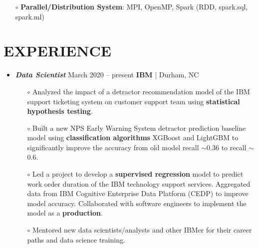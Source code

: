 \documentclass[10pt]{res}
\newcommand{\blockline}{\noindent\hspace{-0.03\textwidth}
{\rule{1.03\textwidth}{0.8pt}}}
\begin{document}
\begin{resume}
\begin{itemize}[leftmargin=0.0cm]
\item[$\circ$]{\textbf{Parallel/Distribution System}: MPI, OpenMP,  Spark (RDD, spark.sql, spark.ml)}
\end{itemize}

 \vspace{-0.25cm}

\section{\large EXPERIENCE}
\vspace{-0.2cm}
\noindent{\blockline}

\begin{itemize} [leftmargin=0.0cm]

\item {\sl \textbf{Data Scientist}}  \hfill March 2020 --  present \newline
 \textbf{IBM} | Durham, NC
 
 \begin{itemize}[leftmargin=0.35cm]
 \item[$\circ$] Analyzed the impact of a detractor recommendation model of the IBM support ticketing system on customer support team using \textbf{statistical hypothesis testing}.
 \item[$\circ$] Built a new NPS Early Warning System detractor prediction baseline model using \textbf{classification algorithms} XGBoost and LightGBM to significantly improve the accuracy from old model recall $\sim$0.36 to recall $\sim$0.6. 
 \item[$\circ$] Led a project to develop a \textbf{supervised regression} model to predict work order duration of the IBM technology support services. Aggregated data from IBM Cognitive Enterprise Data Platform (CEDP) to improve model accuracy.  Collaborated with software engineers to implement the model as a \textbf{production}. 
 \item[$\circ$] Mentored new data scientists/analysts and other IBMer for their career paths and data science training.
 \end{itemize}
 

\end{itemize}
\end{resume}
\end{document}
